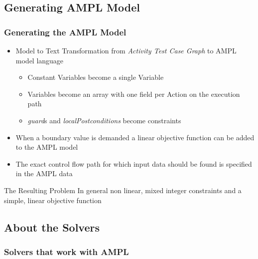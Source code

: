 \documentclass{beamer}
\begin{document}
\subsection{Generating AMPL Model}
\begin{frame}
\frametitle[test]{Generating the AMPL Model}
\begin{itemize}
\item Model to Text Transformation from \emph{Activity Test Case Graph} to AMPL model language
\begin{itemize}
\item Constant Variables become a single Variable
\item Variables become an array with one field per Action on the execution path
\item \emph{guard}s and \emph{localPostconditions} become constraints
\end{itemize} 
\item When a boundary value is demanded a linear objective function can be added to the AMPL model
\item The exact control flow path for which input data should be found is specified in the AMPL data
\end{itemize}
\begin{block}{The Resulting Problem}
In general non linear, mixed integer constraints and a simple, linear objective function
\end{block}
\end{frame}

\subsection{About the Solvers}
\begin{frame}[fragile]
\frametitle{Solvers that work with AMPL\cite{AMPL} }
\end{frame}
\end{document}
